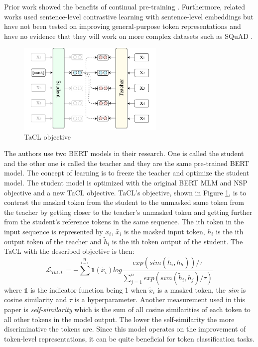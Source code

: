\documentclass[times, utf8, seminar]{fer}
\begin{document}
Prior work showed the benefits of continual pre-training \citep{gururangan2020don}. Furthermore, related works used sentence-level contrastive learning with sentence-level embeddings \citep{giorgi2020declutr} but have not been tested on improving general-purpose token representations and have no evidence that they will work on more complex datasets such as SQuAD \citep{rajpurkar2016squad}.

\begin{figure}[htb]
\centering
\includegraphics[width=7cm]{img/tacl_objective.png}
\caption{TaCL objective}
\label{fig:tacl_objective}
\end{figure}

The authors use two BERT models in their research. One is called the student and the other one is called the teacher and they are the same pre-trained BERT model. The concept of learning is to freeze the teacher and optimize the student model. The student model is optimized with the original BERT MLM and NSP objective \citep{devlin2018bert} and a new TaCL objective. TaCL's objective, shown in Figure \ref{fig:tacl_objective}, is to contrast the masked token from the student to the unmasked same token from the teacher by getting closer to the teacher's unmasked token and getting further from the student's reference tokens in the same sequence. The ith token in the input sequence is represented by $x_i$, $\tilde{x_i}$ is the masked input token, $h_i$ is the ith output token of the teacher and $\tilde{h}_i$ is the ith token output of the student. The TaCL with the described objective is then:
\begin{equation}
\mathcal{L}_{TaCL} = -\sum\limits^n\limits_{i=1} \mathds{1}(\tilde{x}_i)log\frac{exp(sim(\tilde{h}_i, h_h))/\tau}{\sum^n_{j=1}exp(sim(\tilde{h}_i, h_j)/\tau)}
\label{eq:tacl_objective}
\end{equation}
where $\mathds{1}$ is the indicator function being 1 when $\tilde{x}_i$ is a masked token, the \emph{sim} is cosine similarity and $\tau$ is a hyperparameter. Another measurement used in this paper is \emph{self-similarity} which is the sum of all cosine similarities of each token to all other tokens in the model output. The lower the self-similarity the more discriminative the tokens are. Since this model operates on the improvement of token-level representations, it can be quite beneficial for token classification tasks.
\end{document}
